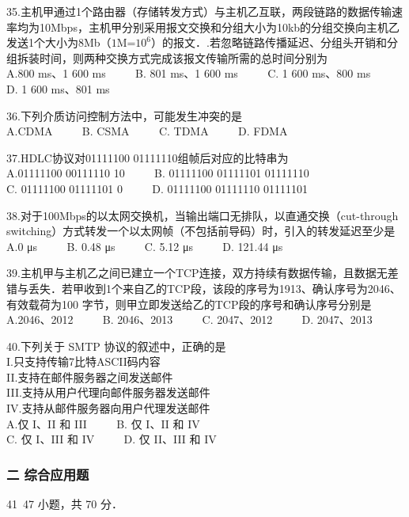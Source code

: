 35.主机甲通过1个路由器（存储转发方式）与主机乙互联，两段链路的数据传输速率均为10Mbps，主机甲分别采用报文交换和分组大小为10kb的分组交换向主机乙发送1个大小为8Mb（$1$M=$10^6$）的报文．.若忽略链路传播延迟、分组头开销和分组拆装时间，则两种交换方式完成该报文传输所需的总时间分别为 \\
A.800 ms、1 600 ms $\qquad$ B. 801 ms、1 600 ms $\qquad$ C. 1 600 ms、800 ms $\qquad$ D. 1 600 ms、801 ms

36.下列介质访问控制方法中，可能发生冲突的是 \\
A.CDMA $\qquad$ B. CSMA $\qquad$ C. TDMA $\qquad$ D. FDMA 

37.HDLC协议对01111100 01111110组帧后对应的比特串为 \\
A.01111100 00111110 10 $\qquad$ B. 01111100 01111101 01111110  \\
C. 01111100 01111101 0 $\qquad$ D. 01111100 01111110 01111101 

38.对于100Mbps的以太网交换机，当输出端口无排队，以直通交换（cut-through switching）方式转发一个以太网帧（不包括前导码）时，引入的转发延迟至少是 \\
A.0 μs $\qquad$ B. 0.48 μs $\qquad$ C. 5.12 μs $\qquad$ D. 121.44 μs

39.主机甲与主机乙之间已建立一个TCP连接，双方持续有数据传输，且数据无差错与丢失．若甲收到1个来自乙的TCP段，该段的序号为1913、确认序号为2046、有效载荷为100 字节，则甲立即发送给乙的TCP段的序号和确认序号分别是 \\
A.2046、2012 $\qquad$ B. 2046、2013 $\qquad$ C. 2047、2012 $\qquad$ D. 2047、2013

40.下列关于 SMTP 协议的叙述中，正确的是 \\
I.只支持传输7比特ASCII码内容 \\
II.支持在邮件服务器之间发送邮件 \\
III.支持从用户代理向邮件服务器发送邮件 \\
IV.支持从邮件服务器向用户代理发送邮件 \\
A.仅 I、II 和 III $\qquad$ B. 仅 I、II 和 IV \\
C. 仅 I、III 和 IV $\qquad$ D. 仅 II、III 和 IV

\subsubsection{二 综合应用题}
41~47 小题，共 70 分．